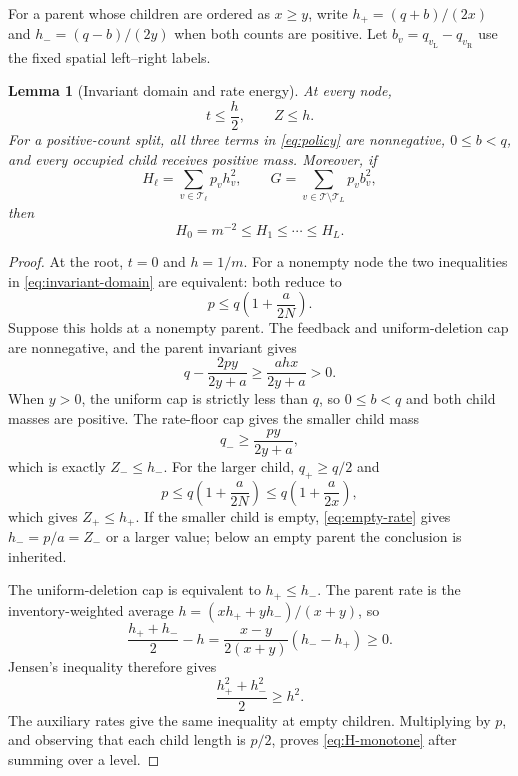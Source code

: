\documentclass[11pt]{article}
\numberwithin{equation}{section}
\newtheorem{lemma}[theorem]{Lemma}
\theoremstyle{remark}
\newcommand{\T}{\mathcal T}
\begin{document}
For a parent whose children are ordered as \(x\ge y\), write
\(h_+=(q+b)/(2x)\) and \(h_-=(q-b)/(2y)\) when both counts are positive.
Let \(b_v=q_{v_{\mathrm L}}-q_{v_{\mathrm R}}\) use the fixed spatial
left--right labels.

\begin{lemma}[Invariant domain and rate energy]\label{lem:invariants}
At every node,
\begin{equation}\label{eq:invariant-domain}
t\le\frac h2,
\qquad Z\le h.
\end{equation}
For a positive-count split, all three terms in \eqref{eq:policy} are
nonnegative, \(0\le b<q\), and every occupied child receives positive
mass. Moreover, if
\begin{equation}\label{eq:H-G}
H_\ell=\sum_{v\in\T_\ell}p_vh_v^2,
\qquad
G=\sum_{v\in\T\setminus\T_L}p_vb_v^2,
\end{equation}
then
\begin{equation}\label{eq:H-monotone}
H_0=m^{-2}\le H_1\le\cdots\le H_L.
\end{equation}
\end{lemma}
\begin{proof}
At the root, \(t=0\) and \(h=1/m\). For a nonempty node the two
inequalities in \eqref{eq:invariant-domain} are equivalent: both reduce to
\[
p\le q\left(1+\frac{a}{2N}\right).
\]
Suppose this holds at a nonempty parent. The feedback and uniform-deletion
cap are nonnegative, and the parent invariant gives
\[
q-\frac{2py}{2y+a}\ge\frac{ahx}{2y+a}>0.
\]
When \(y>0\), the uniform cap is strictly less than \(q\), so
\(0\le b<q\) and both child masses are positive.
The rate-floor cap gives the
smaller child mass
\[
q_-\ge\frac{py}{2y+a},
\]
which is exactly \(Z_-\le h_-\). For the larger child, \(q_+\ge q/2\)
and
\[
p\le q\left(1+\frac a{2N}\right)
\le q\left(1+\frac a{2x}\right),
\]
which gives \(Z_+\le h_+\). If the smaller child is empty,
\eqref{eq:empty-rate} gives \(h_-=p/a=Z_-\) or a larger value; below an
empty parent the conclusion is inherited.

The uniform-deletion cap is equivalent to \(h_+\le h_-\). The
parent rate is the inventory-weighted average
\(h=(xh_++yh_-)/(x+y)\), so
\[
\frac{h_++h_-}{2}-h
=\frac{x-y}{2(x+y)}(h_--h_+)\ge0.
\]
Jensen's inequality therefore gives
\[
\frac{h_+^2+h_-^2}{2}\ge h^2.
\]
The auxiliary rates give the same inequality at empty children. Multiplying
by \(p\), and observing that each child length is \(p/2\), proves
\eqref{eq:H-monotone} after summing over a level.
\end{proof}
\end{document}
